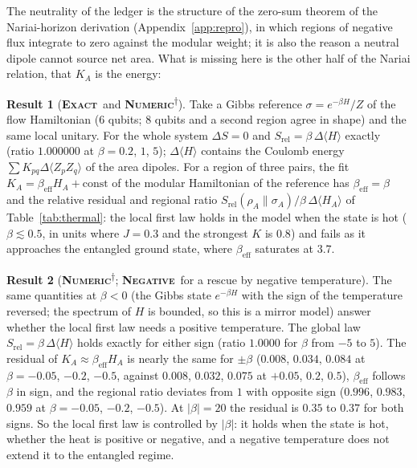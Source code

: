 \documentclass[11pt]{article}
\newcommand{\exact}{\textbf{\textsc{Exact}}}
\newcommand{\numeric}{\textbf{\textsc{Numeric}}}
\newcommand{\negres}{\textbf{\textsc{Negative}}}
\newcommand{\snap}{\textsuperscript{$\dagger$}}      %
\theoremstyle{definition}
\newtheorem{result}{Result}
\begin{document}
The neutrality of the ledger is the structure of the zero-sum theorem of the Nariai-horizon derivation (Appendix~\ref{app:repro}), in which regions of negative flux integrate to zero against the modular weight; it is also the reason a neutral dipole cannot source net area. What is missing here is the other half of the Nariai relation, that $K_A$ is the energy:
\begin{result}[\exact\ and \numeric\snap]\label{res:rel-thermal}
Take a Gibbs reference $\sigma=e^{-\beta H}/Z$ of the flow Hamiltonian ($6$ qubits; $8$ qubits and a second region agree in shape) and the same local unitary. For the whole system $\Delta S=0$ and $S_{\mathrm{rel}}=\beta\,\Delta\langle H\rangle$ exactly (ratio $1.000000$ at $\beta=0.2$, $1$, $5$); $\Delta\langle H\rangle$ contains the Coulomb energy $\sum K_{pq}\Delta\langle Z_pZ_q\rangle$ of the area dipoles. For a region of three pairs, the fit $K_A=\beta_{\mathrm{eff}}H_A+\mathrm{const}$ of the modular Hamiltonian of the reference has $\beta_{\mathrm{eff}}=\beta$ and the relative residual and regional ratio $S_{\mathrm{rel}}(\rho_A\|\sigma_A)/\beta\,\Delta\langle H_A\rangle$ of Table~\ref{tab:thermal}: the local first law holds in the model when the state is hot ($\beta\lesssim0.5$, in units where $J=0.3$ and the strongest $K$ is $0.8$) and fails as it approaches the entangled ground state, where $\beta_{\mathrm{eff}}$ saturates at $3.7$.
\end{result}
\begin{result}[\numeric\snap; \negres\ for a rescue by negative temperature]\label{res:rel-negT}
The same quantities at $\beta<0$ (the Gibbs state $e^{-\beta H}$ with the sign of the temperature reversed; the spectrum of $H$ is bounded, so this is a mirror model) answer whether the local first law needs a positive temperature. The global law $S_{\mathrm{rel}}=\beta\,\Delta\langle H\rangle$ holds exactly for either sign (ratio $1.0000$ for $\beta$ from $-5$ to $5$). The residual of $K_A\approx\beta_{\mathrm{eff}}H_A$ is nearly the same for $\pm\beta$ ($0.008$, $0.034$, $0.084$ at $\beta=-0.05$, $-0.2$, $-0.5$, against $0.008$, $0.032$, $0.075$ at $+0.05$, $0.2$, $0.5$), $\beta_{\mathrm{eff}}$ follows $\beta$ in sign, and the regional ratio deviates from $1$ with opposite sign ($0.996$, $0.983$, $0.959$ at $\beta=-0.05$, $-0.2$, $-0.5$). At $|\beta|=20$ the residual is $0.35$ to $0.37$ for both signs. So the local first law is controlled by $|\beta|$: it holds when the state is hot, whether the heat is positive or negative, and a negative temperature does not extend it to the entangled regime.
\end{result}
\end{document}
